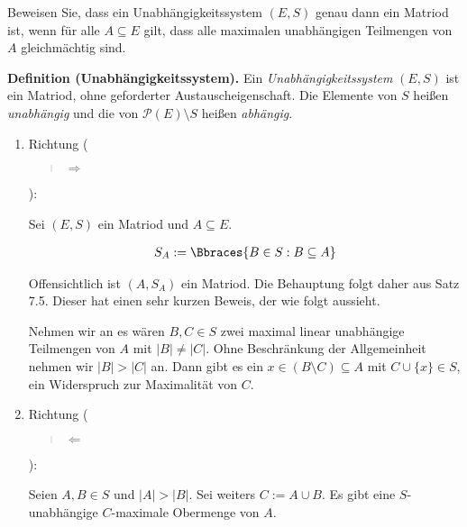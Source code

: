 
\begin{exercise}

Beweisen Sie, dass ein Unabhängigkeitssystem $(E, S)$ genau dann ein Matriod ist, wenn für alle $A \subseteq E$ gilt, dass alle maximalen unabhängigen Teilmengen von $A$ gleichmächtig sind.

\end{exercise}


\begin{solution}

\phantom{}


\textbf{Definition (Unabhängigkeitssystem).}
Ein \textit{Unabhängigkeitssystem} $(E, S)$ ist ein Matriod, ohne geforderter Austauscheigenschaft.
Die Elemente von $S$ heißen \textit{unabhängig} und die von $\mathcal{P}(E) \setminus S$ heißen \textit{abhängig}.

\begin{enumerate}[label = \arabic*.]

    \item Richtung (\blockquote{$\Rightarrow$}):


    Sei $(E, S)$ ein Matriod und $A \subseteq E$.

    \begin{align*}
        S_A := \Bbraces{B \in S: B \subseteq A}
    \end{align*}

    Offensichtlich ist $(A, S_A)$ ein Matriod.
    Die Behauptung folgt daher aus Satz 7.5. Dieser hat einen sehr kurzen Beweis, der wie folgt aussieht.
    
   	Nehmen wir an es wären $B,C \in S$ zwei maximal linear unabhängige Teilmengen von $A$ mit $|B| \neq |C|$. Ohne Beschränkung der Allgemeinheit nehmen wir $|B| > |C|$ an. Dann gibt es ein $x \in (B \setminus C) \subseteq A$  mit $C \cup \{x\} \in S$, ein Widerspruch zur Maximalität von $C$. 

    \item Richtung (\blockquote{$\Leftarrow$}):
    
    Seien $A, B \in S$ und $|A| > |B|$.
    Sei weiters $C := A \cup B$.
    Es gibt eine $S$-unabhängige $C$-maximale Obermenge von $A$.


\end{enumerate}
\end{solution}
